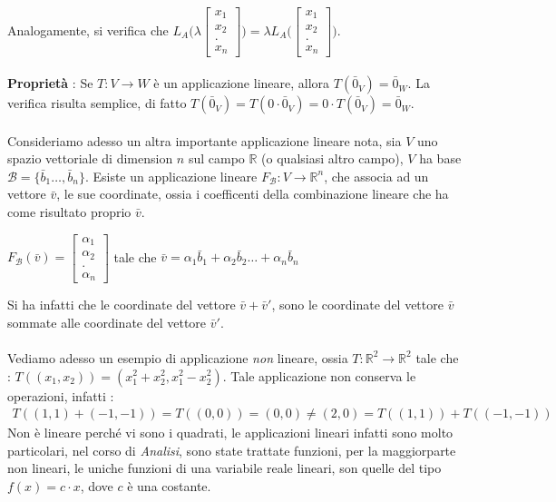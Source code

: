 \documentclass[12pt, letterpaper]{article}
\newcommand{\R}{{\mathbb R}}
\newcommand{\acc}{\\\hphantom{}\\}
\begin{document}
Analogamente, si verifica che \(L_A\Bigg(\lambda \begin{bmatrix}
    x_1\\x_2\\.\\x_n
\end{bmatrix}\Bigg)=\lambda L_A\Bigg( \begin{bmatrix}
    x_1\\x_2\\.\\x_n
\end{bmatrix}\Bigg)\).\acc 
\textbf{Proprietà }: Se \(T:V\rightarrow W\) è un applicazione lineare, allora \(T(\bar 0_V)=\bar 0_W\). La verifica risulta 
semplice, di fatto \(T(\bar 0_V)=T(0\cdot \bar 0_V)=0\cdot T(\bar 0_V) = \bar 0_W\).\acc 
Consideriamo adesso un altra importante applicazione lineare nota, sia \(V\) uno spazio vettoriale di dimension \(n\)
 sul campo \(\R\) (o qualsiasi altro campo), \(V\) ha base \(\mathcal{B}=\{\bar b_1\dots,\bar b_n\}\). Esiste un applicazione 
 lineare \(F_{\mathcal{B}} : V \rightarrow \R^n\), che associa ad un vettore \(\bar v\), le sue coordinate, ossia i coefficenti della combinazione lineare che ha 
 come risultato proprio \(\bar v\). \begin{center}
    \(F_{\mathcal{B}}(\bar v)=\begin{bmatrix}
        \alpha_1\\\alpha_2\\.\\\alpha_n
    \end{bmatrix}\)\hphantom{text} tale che \hphantom{text}\(\bar v = \alpha_1\bar b_1+ \alpha_2\bar b_2\dots +\alpha_n\bar b_n\)
 \end{center}
 Si ha infatti che le coordinate del vettore \(\bar v + \bar v'\), sono le coordinate del vettore \(\bar v\) sommate alle 
 coordinate del vettore \(\bar v'\).\acc 
 Vediamo adesso un esempio di applicazione \textit{non} lineare, ossia \(T:\R^2\rightarrow \R^2\) tale che : \(T((x_1,x_2))=(x_1^2+x_2^2,x_1^2-x_2^2)\). 
 Tale applicazione non conserva le operazioni, infatti : \begin{eqnarray}
    T((1,1)+(-1,-1))=T((0,0))=(0,0)\ne (2,0)=T((1,1))+T((-1,-1))
 \end{eqnarray}
 Non è lineare perché vi sono i quadrati, le applicazioni lineari infatti sono molto particolari, nel corso di 
 \textit{Analisi}, sono state trattate funzioni, per la maggiorparte non lineari, le uniche funzioni 
 di una variabile reale lineari, son quelle del tipo \(f(x)=c\cdot x\), dove \(c\) è una costante. 
\end{document}
